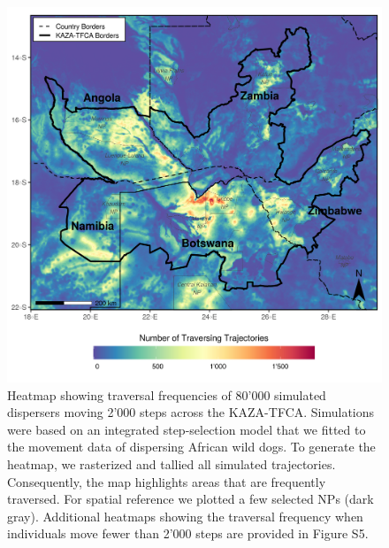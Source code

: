 \documentclass[abstract=on,10pt,a4paper,bibliography=totocnumbered]{article}
\begin{document}
\begin{figure}
  \includegraphics[width=\textwidth]{99_Heatmap.png}
  \caption{Heatmap showing traversal frequencies of 80'000 simulated dispersers
  moving 2'000 steps across the KAZA-TFCA. Simulations were based on an
  integrated step-selection model that we fitted to the movement data of
  dispersing African wild dogs. To generate the heatmap, we rasterized and
  tallied all simulated trajectories. Consequently, the map highlights areas
  that are frequently traversed. For spatial reference we plotted a few selected
  NPs (dark gray). Additional heatmaps showing the traversal frequency when
  individuals move fewer than 2'000 steps are provided in Figure S5.}
  \label{Heatmap}
\end{figure}
\end{document}
